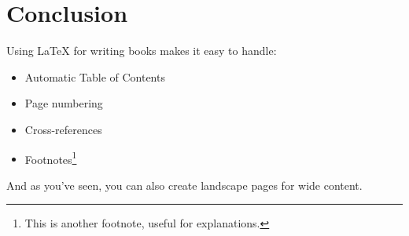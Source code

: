 \documentclass{book}
\begin{document}
	\newpage 
	
	\chapter{Conclusion}
	
	Using LaTeX for writing books makes it easy to handle:
	\begin{itemize}
		\item Automatic Table of Contents
		\item Page numbering
		\item Cross-references
		\item Footnotes\footnote{This is another footnote, useful for explanations.}
	\end{itemize}
	
	And as you’ve seen, you can also create landscape pages for wide content.
	
\end{document}
